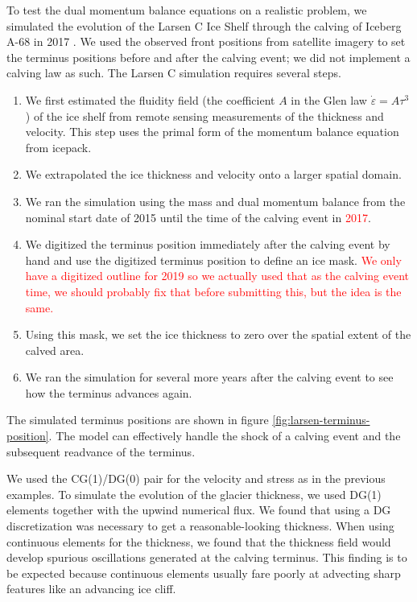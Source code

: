 \documentclass{article}
\theoremstyle{definition}
\theoremstyle{plain}
\begin{document}
To test the dual momentum balance equations on a realistic problem, we simulated the evolution of the Larsen C Ice Shelf through the calving of Iceberg A-68 in 2017 \citep{larour2021physical}.
We used the observed front positions from satellite imagery to set the terminus positions before and after the calving event; we did not implement a calving law as such.
The Larsen C simulation requires several steps.
\begin{enumerate}
    \item We first estimated the fluidity field (the coefficient $A$ in the Glen law $\dot\varepsilon = A\tau^3$) of the ice shelf from remote sensing measurements of the thickness and velocity.
        This step uses the primal form of the momentum balance equation from icepack.
    \item We extrapolated the ice thickness and velocity onto a larger spatial domain.
    \item We ran the simulation using the mass and dual momentum balance from the nominal start date of 2015 until the time of the calving event in \textcolor{red}{2017}.
    \item We digitized the terminus position immediately after the calving event by hand and use the digitized terminus position to define an ice mask.
        \textcolor{red}{We only have a digitized outline for 2019 so we actually used that as the calving event time, we should probably fix that before submitting this, but the idea is the same.}
    \item Using this mask, we set the ice thickness to zero over the spatial extent of the calved area.
    \item We ran the simulation for several more years after the calving event to see how the terminus advances again.
\end{enumerate}
The simulated terminus positions are shown in figure \ref{fig:larsen-terminus-position}.
The model can effectively handle the shock of a calving event and the subsequent readvance of the terminus.

We used the CG(1)/DG(0) pair for the velocity and stress as in the previous examples.
To simulate the evolution of the glacier thickness, we used DG(1) elements together with the upwind numerical flux.
We found that using a DG discretization was necessary to get a reasonable-looking thickness.
When using continuous elements for the thickness, we found that the thickness field would develop spurious oscillations generated at the calving terminus.
This finding is to be expected because continuous elements usually fare poorly at advecting sharp features like an advancing ice cliff.
\end{document}
